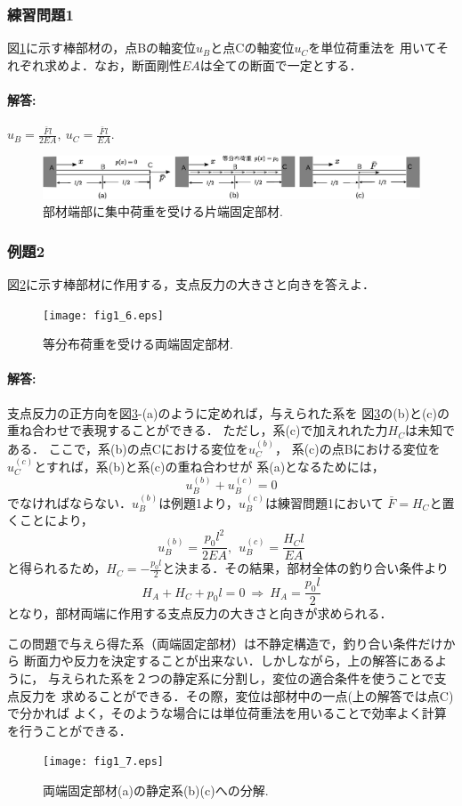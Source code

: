 \documentclass[10pt,a4j]{jarticle}
\begin{document}
\subsubsection{練習問題1}
図\ref{fig:fig1_5}に示す棒部材の，点Bの軸変位$u_B$と点Cの軸変位$u_C$を単位荷重法を
用いてそれぞれ求めよ．なお，断面剛性$EA$は全ての断面で一定とする．
\paragraph{解答:}
$u_B=\frac{\bar Fl}{2EA},\ u_C=\frac{\bar Fl}{EA}.$
\begin{figure}[h]
	\begin{center}
	\includegraphics[width=0.4\linewidth]{fig1_5.eps} 
	\end{center}
	\caption{部材端部に集中荷重を受ける片端固定部材.} 
	\label{fig:fig1_5}
\end{figure}
\subsubsection{例題2}
図\ref{fig:fig1_6}に示す棒部材に作用する，支点反力の大きさと向きを答えよ．
\begin{figure}[h]
	\begin{center}
	\texttt{[image: fig1\_6.eps]} 
	\end{center}
	\caption{等分布荷重を受ける両端固定部材.} 
	\label{fig:fig1_6}
\end{figure}
\paragraph{解答:}
支点反力の正方向を図\ref{fig:fig1_7}-(a)のように定めれば，与えられた系を
図\ref{fig:fig1_7}の(b)と(c)の重ね合わせで表現することができる．
ただし，系(c)で加えれれた力$H_C$は未知である．
ここで，系(b)の点Cにおける変位を$u_C^{(b)}$，
系(c)の点Bにおける変位を$u_C^{(c)}$とすれば，系(b)と系(c)の重ね合わせが
系(a)となるためには，
\[
	u_B^{(b)}+u_B^{(c)}=0
\]
でなければならない．$u_B^{(b)}$は例題1より，$u_B^{(c)}$は練習問題1において
$\bar{F}=H_C$と置くことにより，
\[
	u_B^{(b)}=\frac{p_0l^2}{2EA}
	, \ \ 	
	u_B^{(c)}=\frac{H_Cl}{EA}
\]
と得られるため，$H_C=-\frac{p_0l}{2}$と決まる．その結果，部材全体の釣り合い条件より
\[
	H_A+H_C+p_0l=0 \ \Rightarrow \ H_A=\frac{p_0l}{2}
\]
となり，部材両端に作用する支点反力の大きさと向きが求められる．

この問題で与えら得た系（両端固定部材）は不静定構造で，釣り合い条件だけから
断面力や反力を決定することが出来ない．しかしながら，上の解答にあるように，
与えられた系を２つの静定系に分割し，変位の適合条件を使うことで支点反力を
求めることができる．その際，変位は部材中の一点(上の解答では点C)で分かれば
よく，そのような場合には単位荷重法を用いることで効率よく計算を行うことができる．
\begin{figure}[h]
	\begin{center}
	\texttt{[image: fig1\_7.eps]} 
	\end{center}
	\caption{両端固定部材(a)の静定系(b)(c)への分解.} 
	\label{fig:fig1_7}
\end{figure}
\end{document}
